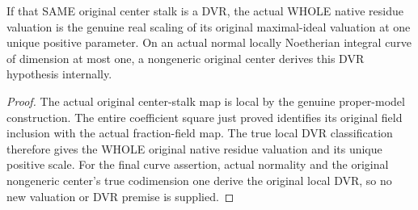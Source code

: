 \begin{lemma}
\label{lem:actual-generic-center-unique-dvr-scale}
\leanok
If that SAME original center stalk is a DVR, the actual WHOLE native residue
valuation is the genuine real scaling of its original maximal-ideal valuation
at one unique positive parameter. On an actual normal locally Noetherian
integral curve of dimension at most one, a nongeneric original center derives
this DVR hypothesis internally.
\end{lemma}
\begin{proof}
The actual original center-stalk map is local by the genuine proper-model
construction. The entire coefficient square just proved identifies its
original field inclusion with the actual fraction-field map. The true local
DVR classification therefore gives the WHOLE original native residue
valuation and its unique positive scale. For the final curve assertion,
actual normality and the original nongeneric center's true codimension one
derive the original local DVR, so no new valuation or DVR premise is supplied.
\end{proof}
